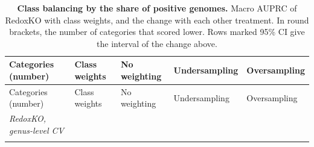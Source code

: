 \documentclass[10pt,a4paper,onecolumn]{article}
\begin{document}
{\begin{longtable}[]{@{}
  >{\raggedright\arraybackslash}p{}
  >{\raggedleft\arraybackslash}p{}
  >{\raggedleft\arraybackslash}p{}
  >{\raggedleft\arraybackslash}p{}
  >{\raggedleft\arraybackslash}p{}@{}}
\caption{\textbf{Class balancing by the share of positive genomes.}
Macro AUPRC of RedoxKO with class weights, and the change with each
other treatment. In round brackets, the number of categories that scored
lower. Rows marked 95\% CI give the interval of the change above.
\label{tab:s_balance}}\tabularnewline
\toprule\noalign{}
\begin{minipage}[b]{\linewidth}\raggedright
Categories (number)
\end{minipage} & \begin{minipage}[b]{\linewidth}\raggedleft
Class weights
\end{minipage} & \begin{minipage}[b]{\linewidth}\raggedleft
No weighting
\end{minipage} & \begin{minipage}[b]{\linewidth}\raggedleft
Undersampling
\end{minipage} & \begin{minipage}[b]{\linewidth}\raggedleft
Oversampling
\end{minipage} \\
\midrule\noalign{}
\endfirsthead
\toprule\noalign{}
\begin{minipage}[b]{\linewidth}\raggedright
Categories (number)
\end{minipage} & \begin{minipage}[b]{\linewidth}\raggedleft
Class weights
\end{minipage} & \begin{minipage}[b]{\linewidth}\raggedleft
No weighting
\end{minipage} & \begin{minipage}[b]{\linewidth}\raggedleft
Undersampling
\end{minipage} & \begin{minipage}[b]{\linewidth}\raggedleft
Oversampling
\end{minipage} \\
\midrule\noalign{}
\endhead
\bottomrule\noalign{}
\endlastfoot
\emph{RedoxKO, genus-level CV} & & & & \\*

\end{longtable}}
\end{document}

